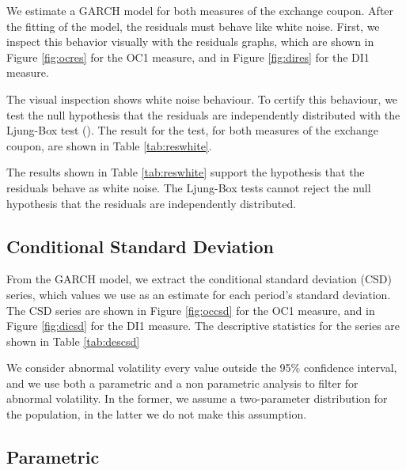 \documentclass[cic,tc, english]{iiufrgs}
\begin{document}
    We estimate a GARCH model for both measures of the exchange coupon. After the fitting of the model, the residuals must behave like white noise. First, we inspect this behavior visually with the residuals graphs, which are shown in Figure \ref{fig:ocres} for the OC1 measure, and in Figure \ref{fig:dires} for the DI1 measure.

    

    

    The visual inspection shows white noise behaviour. To certify this behaviour, we test the null hypothesis that the residuals are independently distributed with the Ljung-Box test (\citet{ljungbox}). The result for the test, for both measures of the exchange coupon, are shown in Table \ref{tab:reswhite}.

    

    The results shown in Table \ref{tab:reswhite} support the hypothesis that the residuals behave as white noise. The Ljung-Box tests cannot reject the null hypothesis that the residuals are independently distributed.

\subsection{Conditional Standard Deviation}

    From the GARCH model, we extract the conditional standard deviation (CSD) series, which values we use as an estimate for each period's standard deviation. The CSD series are shown in Figure \ref{fig:occsd} for the OC1 measure, and in Figure \ref{fig:dicsd} for the DI1 measure. The descriptive statistics for the series are shown in Table \ref{tab:descsd}

    

    

    

    We consider abnormal volatility every value outside the 95\% confidence interval, and we use both a parametric and a non parametric analysis to filter for abnormal volatility. In the former, we assume a two-parameter distribution for the population, in the latter we do not make this assumption.

\subsection{Parametric}
\end{document}
